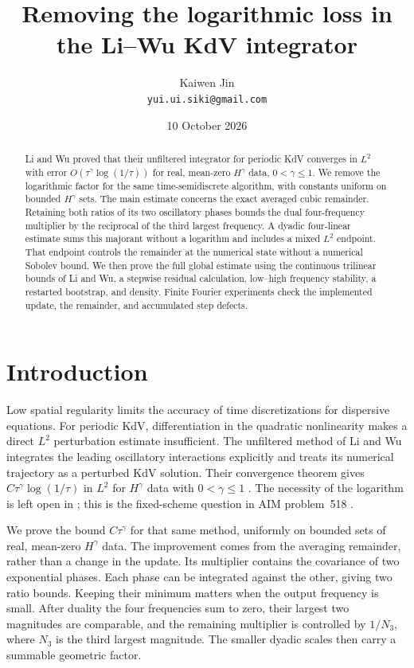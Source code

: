 \documentclass[11pt]{article}
\title{Removing the logarithmic loss in the Li--Wu KdV integrator}
\author{Kaiwen Jin\\\texttt{yui.ui.siki@gmail.com}}
\date{10 October 2026}
\theoremstyle{remark}\newtheorem{remark}[theorem]{Remark}
\begin{document}
\maketitle
\begin{abstract}
Li and Wu proved that their unfiltered integrator for periodic KdV converges
in $L^2$ with error $O(\tau^\gamma\log(1/\tau))$ for real, mean-zero
$H^\gamma$ data, $0<\gamma\leq1$. We remove the logarithmic factor for the
same time-semidiscrete algorithm, with constants uniform on bounded
$H^\gamma$ sets. The main estimate concerns the exact averaged cubic
remainder. Retaining both ratios of its two oscillatory phases bounds the
dual four-frequency multiplier by the reciprocal of the third largest
frequency. A dyadic four-linear estimate sums this majorant without a
logarithm and includes a mixed $L^2$ endpoint. That endpoint controls the
remainder at the numerical state without a numerical Sobolev bound.
We then prove the full global estimate using the continuous trilinear
bounds of Li and Wu, a stepwise residual calculation, low--high frequency
stability, a restarted bootstrap, and density. Finite Fourier experiments
check the implemented update, the remainder, and accumulated step defects.
\end{abstract}

\section{Introduction}
Low spatial regularity limits the accuracy of time discretizations for
dispersive equations. For periodic KdV, differentiation in the quadratic
nonlinearity makes a direct $L^2$ perturbation estimate insufficient.
The unfiltered method of Li and Wu integrates the leading oscillatory
interactions explicitly and treats its numerical trajectory as a perturbed
KdV solution. Their convergence theorem gives
$C\tau^\gamma\log(1/\tau)$ in $L^2$ for $H^\gamma$ data with
$0<\gamma\leq1$ \cite[Theorem~1.1]{LW}.
The necessity of the logarithm is left open in
\cite[Section~11]{LW}; this is the fixed-scheme question in
AIM problem~518 \cite{AIM}.

We prove the bound $C\tau^\gamma$ for that same method, uniformly on bounded
sets of real, mean-zero $H^\gamma$ data. The improvement comes from the
averaging remainder, rather than a change in the update. Its multiplier
contains the covariance of two exponential phases. Each phase can be
integrated against the other, giving two ratio bounds. Keeping their
minimum matters when the output frequency is small. After duality the four
frequencies sum to zero, their largest two magnitudes are comparable, and
the remaining multiplier is controlled by $1/N_3$, where $N_3$ is the
third largest magnitude. The smaller dyadic scales then carry a summable
geometric factor.
\end{document}
